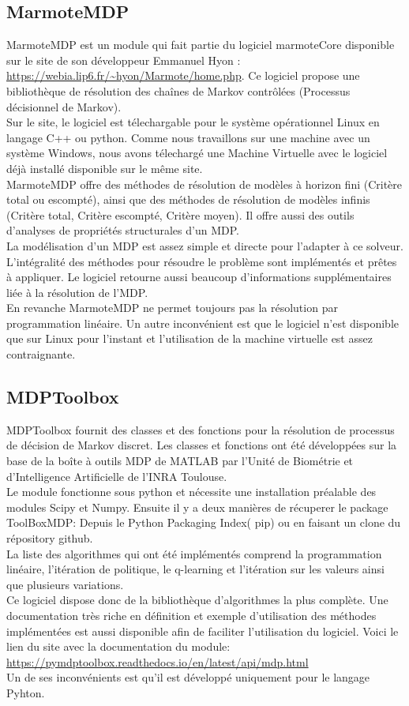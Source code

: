 \documentclass{article}
\begin{document}
\subsection{MarmoteMDP}
MarmoteMDP est un module qui fait partie du logiciel marmoteCore disponible sur le site de son développeur Emmanuel Hyon : \url{https://webia.lip6.fr/~hyon/Marmote/home.php}. Ce logiciel propose une bibliothèque de résolution des chaînes de Markov contrôlées (Processus décisionnel de Markov).\\
Sur le site, le logiciel est télechargable pour le système opérationnel Linux en langage C++ ou python. Comme nous travaillons sur une machine avec un système Windows, nous avons télechargé une Machine Virtuelle avec le logiciel déjà installé disponible sur le même site. \\
MarmoteMDP offre des méthodes de résolution de modèles à horizon fini (Critère total ou escompté), ainsi que des méthodes de résolution de modèles infinis (Critère total, Critère escompté, Critère moyen). Il offre aussi des outils d'analyses de propriétés structurales d'un MDP.\\
La modélisation d'un MDP est assez simple et directe pour l'adapter à ce solveur. L'intégralité des méthodes pour résoudre le problème sont implémentés et prêtes à appliquer. Le logiciel retourne aussi beaucoup d'informations supplémentaires liée à la résolution de l'MDP.\\
En revanche MarmoteMDP ne permet toujours pas la résolution par programmation linéaire. Un autre inconvénient est que le logiciel n'est disponible que sur Linux pour l'instant et l'utilisation de la machine virtuelle est assez contraignante.\\

\subsection{MDPToolbox}
MDPToolbox fournit des classes et des fonctions pour la résolution de processus de décision de Markov discret. Les classes et fonctions ont été développées sur la base de la boîte à outils MDP de MATLAB par l'Unité de Biométrie et d'Intelligence Artificielle de l'INRA Toulouse.\\
Le module fonctionne sous python et nécessite une installation préalable des modules Scipy et Numpy. Ensuite il y a deux manières de récuperer le package ToolBoxMDP: Depuis le Python Packaging Index( pip) ou en faisant un clone du répository github.\\
La liste des algorithmes qui ont été implémentés comprend la programmation linéaire, l'itération de politique, le q-learning et l'itération sur les valeurs ainsi que plusieurs variations.\\
Ce logiciel dispose donc de la bibliothèque d'algorithmes la plus complète. Une documentation très riche en définition et exemple d'utilisation des méthodes implémentées est aussi disponible afin de faciliter l'utilisation du logiciel. Voici le lien du site avec la documentation du module: \url{https://pymdptoolbox.readthedocs.io/en/latest/api/mdp.html} \\
Un de ses inconvénients est qu'il est développé uniquement pour le langage Pyhton.\\
\end{document}
